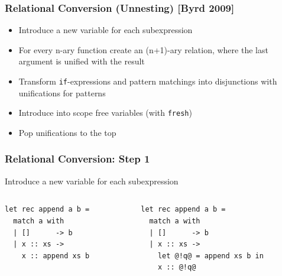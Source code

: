 \documentclass[xcolor=table]{beamer}
\begin{document}
\begin{frame}[fragile]
  \transwipe[direction=90]
  \frametitle{Relational Conversion (Unnesting) [Byrd 2009]}


\begin{itemize}
  \item Introduce a new variable for each subexpression
  \item For every n-ary function create an (n+1)-ary relation, where the last argument is unified with the result
  \item Transform \lstinline{if}-expressions and pattern matchings into disjunctions with unifications for patterns
  \item Introduce into scope free variables (with \lstinline{fresh})
  \item Pop unifications to the top
\end{itemize}
\end{frame}

\begin{frame}[fragile]
  \transwipe[direction=90]
  \frametitle{Relational Conversion: Step 1}
\begin{center}
Introduce a new variable for each subexpression
\end{center}

\begin{columns}
\begin{column}{0.5\textwidth}
\begin{lstlisting}
let rec append a b =
  match a with
  | []      -> b
  | x :: xs ->
    x :: append xs b
\end{lstlisting}
\end{column}
\begin{column}{0.5\textwidth}
\begin{lstlisting}
let rec append a b =
  match a with
  | []      -> b
  | x :: xs ->
    let @!q@ = append xs b in
    x :: @!q@
\end{lstlisting}
\end{column}
\end{columns}
\end{frame}
\end{document}
